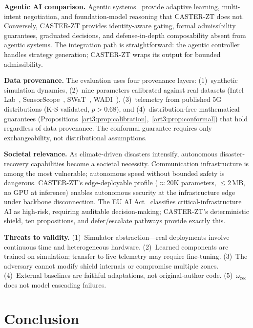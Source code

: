 \noindent\textbf{Agentic AI comparison.}
Agentic systems~\cite{toward_autonomous_oran_2026,demirel2026agentic} provide adaptive learning, multi-intent negotiation, and foundation-model reasoning that CASTER-ZT does not.
Conversely, CASTER-ZT provides identity-aware gating, formal admissibility guarantees, graduated decisions, and defense-in-depth composability absent from agentic systems.
The integration path is straightforward: the agentic controller handles strategy generation; CASTER-ZT wraps its output for bounded admissibility.

\noindent\textbf{Data provenance.}
The evaluation uses four provenance layers: (1)~synthetic simulation dynamics, (2)~nine parameters calibrated against real datasets (Intel Lab~\cite{intel_lab_data_2004}, SensorScope~\cite{sensorscope2008}, SWaT~\cite{goh2017swat}, WADI~\cite{wadi2018}), (3)~telemetry from published 5G distributions (K-S validated, $p>0.68$), and (4)~distribution-free mathematical guarantees (Propositions~\ref{art3:prop:calibration},~\ref{art3:prop:conformal}) that hold regardless of data provenance.
The conformal guarantee requires only exchangeability, not distributional assumptions.

\noindent\textbf{Societal relevance.}
As climate-driven disasters intensify, autonomous disaster-recovery capabilities become a societal necessity.
Communication infrastructure is among the most vulnerable; autonomous speed without bounded safety is dangerous.
CASTER-ZT's edge-deployable profile ($\approx$20K parameters, $\le$2\,MB, no GPU at inference) enables autonomous security at the infrastructure edge under backbone disconnection.
The EU AI Act~\cite{euaiact2024} classifies critical-infrastructure AI as high-risk, requiring auditable decision-making; CASTER-ZT's deterministic shield, ten propositions, and defer/escalate pathways provide exactly this.

\noindent\textbf{Threats to validity.}
(1)~Simulator abstraction---real deployments involve continuous time and heterogeneous hardware.
(2)~Learned components are trained on simulation; transfer to live telemetry may require fine-tuning.
(3)~The adversary cannot modify shield internals or compromise multiple zones.
(4)~External baselines are faithful adaptations, not original-author code.
(5)~$\omega_{\mathrm{rec}}$ does not model cascading failures.


\section{Conclusion}
\label{art3:sec:conclusion}


